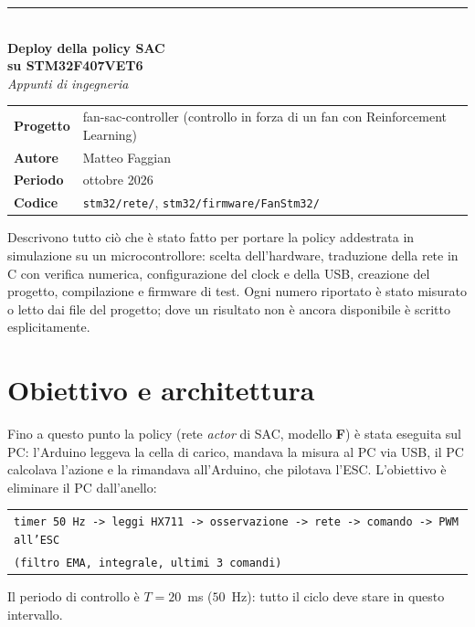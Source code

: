 \documentclass[11pt,a4paper]{article}
\newcommand{\code}[1]{\texttt{\small #1}}
\begin{document}
\begin{titlepage}
\vspace*{3cm}
{\color{brick}\rule{3cm}{3pt}}\\[0.8em]
{\Huge\bfseries\color{navy} Deploy della policy SAC\\[0.2em] su STM32F407VET6}\\[1.2em]
{\Large\itshape Appunti di ingegneria}\\[3em]
\begin{tabular}{@{}ll}
\textbf{Progetto} & fan-sac-controller (controllo in forza di un fan con Reinforcement Learning)\\
\textbf{Autore}   & Matteo Faggian\\
\textbf{Periodo}  & ottobre 2026\\
\textbf{Codice}   & \code{stm32/rete/}, \code{stm32/firmware/FanStm32/}\\
\end{tabular}
\vfill
\begin{nota}
Descrivono tutto ciò che è stato fatto per portare la policy addestrata in simulazione
su un microcontrollore: scelta dell'hardware, traduzione della rete in C con verifica numerica,
configurazione del clock e della USB, creazione del progetto, compilazione e firmware di test.
Ogni numero riportato è stato misurato o letto dai file del progetto; dove un risultato non è
ancora disponibile è scritto esplicitamente.
\end{nota}
\end{titlepage}

\tableofcontents
\newpage

\section{Obiettivo e architettura}

Fino a questo punto la policy (rete \emph{actor} di SAC, modello \textbf{F}) è stata eseguita sul PC:
l'Arduino leggeva la cella di carico, mandava la misura al PC via USB, il PC calcolava l'azione
e la rimandava all'Arduino, che pilotava l'ESC. L'obiettivo è eliminare il PC dall'anello:
\begin{center}
\small
\begin{tabular}{@{}l@{}}
\code{timer 50 Hz -> leggi HX711 -> osservazione -> rete -> comando -> PWM all'ESC}\\
\code{\hphantom{timer 50 Hz -> leggi HX711 -> }(filtro EMA, integrale, ultimi 3 comandi)}
\end{tabular}
\end{center}
Il periodo di controllo è $T = 20$~ms ($50$~Hz): tutto il ciclo deve stare in questo intervallo.
\end{document}

